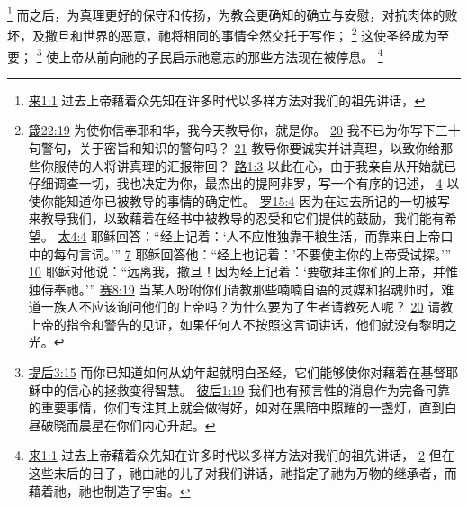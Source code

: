 \documentclass[12pt, a4paper, oneside]{ctexart}
\begin{document}
	\footnote {
		\href{https://biblehub.com/hebrews/1-1.htm}{来1:1} 过去上帝藉着众先知在许多时代以多样方法对我们的祖先讲话，
	}
	而之后，为真理更好的保守和传扬，为教会更确知的确立与安慰，对抗肉体的败坏，及撒旦和世界的恶意，祂将相同的事情全然交托于写作；
	\footnote {
		\href{https://biblehub.com/proverbs/22-19.htm}{箴22:19} 为使你信奉耶和华，我今天教导你，就是你。
		\href{https://biblehub.com/proverbs/22-20.htm}{20} 我不已为你写下三十句警句，关于密旨和知识的警句吗？
		\href{https://biblehub.com/proverbs/22-21.htm}{21} 教导你要诚实并讲真理，以致你给那些你服侍的人将讲真理的汇报带回？ 
		\href{https://biblehub.com/luke/1-3.htm}{路1:3} 以此在心，由于我亲自从开始就已仔细调查一切，我也决定为你，最杰出的提阿非罗，写一个有序的记述，
		\href{https://biblehub.com/luke/1-4.htm}{4} 以使你能知道你已被教导的事情的确定性。
		\href{https://biblehub.com/romans/15-4.htm}{罗15:4} 因为在过去所记的一切被写来教导我们，以致藉着在经书中被教导的忍受和它们提供的鼓励，我们能有希望。
		\href{https://biblehub.com/matthew/4-4.htm}{太4:4} 耶稣回答：“经上记着：‘人不应惟独靠干粮生活，而靠来自上帝口中的每句言词。’” 
		\href{https://biblehub.com/matthew/4-7.htm}{7} 耶稣回答他：“经上也记着：'不要使主你的上帝受试探。’”
		\href{https://biblehub.com/matthew/4-10.htm}{10} 耶稣对他说：“远离我，撒旦！因为经上记着：‘要敬拜主你们的上帝，并惟独侍奉祂。’”
		\href{https://biblehub.com/isaiah/8-19.htm}{赛8:19} 当某人吩咐你们请教那些喃喃自语的灵媒和招魂师时，难道一族人不应该询问他们的上帝吗？为什么要为了生者请教死人呢？
		\href{https://biblehub.com/isaiah/8-20.htm}{20} 请教上帝的指令和警告的见证，如果任何人不按照这言词讲话，他们就没有黎明之光。
	}
	这使圣经成为至要；
	\footnote {
		\href{https://biblehub.com/2_timothy/3-15.htm}{提后3:15} 而你已知道如何从幼年起就明白圣经，它们能够使你对藉着在基督耶稣中的信心的拯救变得智慧。
		\href{https://biblehub.com/2_peter/1-19.htm}{彼后1:19} 我们也有预言性的消息作为完备可靠的重要事情，你们专注其上就会做得好，如对在黑暗中照耀的一盏灯，直到白昼破晓而晨星在你们内心升起。
	}
	使上帝从前向祂的子民启示祂意志的那些方法现在被停息。
	\footnote {
		\href{https://biblehub.com/hebrews/1-1.htm}{来1:1} 过去上帝藉着众先知在许多时代以多样方法对我们的祖先讲话，
		\href{https://biblehub.com/hebrews/1-2.htm}{2} 但在这些末后的日子，祂由祂的儿子对我们讲话，祂指定了祂为万物的继承者，而藉着祂，祂也制造了宇宙。
	}
\end{document}
